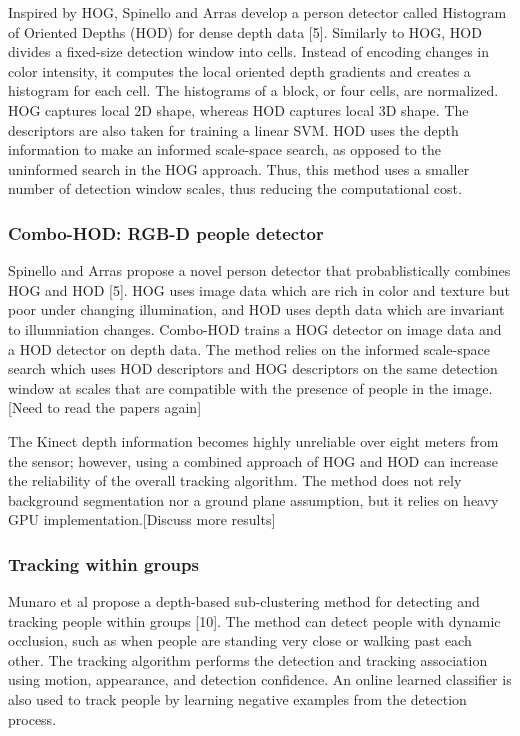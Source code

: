 \documentclass[paper=a4, fontsize=11pt]{scrartcl}
\numberwithin{equation}{section}		%
\numberwithin{figure}{section}			%
\numberwithin{table}{section}				%
\begin{document}
Inspired by HOG, Spinello and Arras develop a person detector called Histogram of Oriented Depths (HOD) for dense depth data [5]. Similarly to HOG, HOD divides a fixed-size detection window into cells. Instead of encoding changes in color intensity, it computes the local oriented depth gradients and creates a histogram for each cell. The histograms of a block, or four cells, are normalized. HOG captures local 2D shape, whereas HOD captures local 3D shape. The descriptors are also taken for training a linear SVM. HOD uses the depth information to make an informed scale-space search, as opposed to the uninformed search in the HOG approach. Thus, this method uses a smaller number of detection window scales, thus reducing the computational cost.

\subsubsection{Combo-HOD: RGB-D people detector}

Spinello and Arras propose a novel person detector that probablistically combines HOG and HOD [5]. HOG uses image data which are rich in color and texture but poor under changing illumination, and HOD uses depth data which are invariant to illumniation changes. Combo-HOD trains a HOG detector on image data and a HOD detector on depth data. The method relies on the informed scale-space search which uses HOD descriptors and HOG descriptors on the same detection window at scales that are compatible with the presence of people in the image. [Need to read the papers again]

The Kinect depth information becomes highly unreliable over eight meters from the sensor; however, using a combined approach of HOG and HOD can increase the reliability of the overall tracking algorithm. The method does not rely background segmentation nor a ground plane assumption, but it relies on heavy GPU implementation.[Discuss more results]

\subsubsection{Tracking within groups}

Munaro et al propose a depth-based sub-clustering method for detecting and tracking people within groups [10]. The method can detect people with dynamic occlusion, such as when people are standing very close or walking past each other. The tracking algorithm performs the detection and tracking association using motion, appearance, and detection confidence. An online learned classifier is also used to track people by learning negative examples from the detection process.
\end{document}
